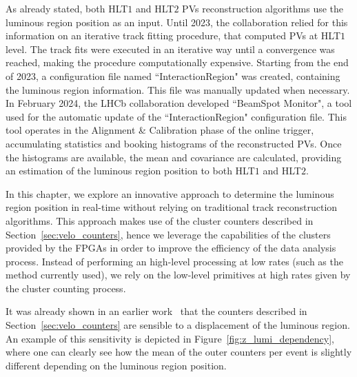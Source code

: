 As already stated, both HLT$1$ and HLT$2$ PVs reconstruction algorithms use the luminous region position as an input. Until 2023, the collaboration relied for this information on an iterative track fitting procedure, that computed PVs at HLT$1$ level. The track fits were executed in an iterative way until a convergence was reached, making the procedure computationally expensive. Starting from the end of 2023, a configuration file named ``InteractionRegion" was created, containing the luminous region information. This file was manually updated when necessary. In February 2024, the LHCb collaboration developed ``BeamSpot Monitor", a tool used for the automatic update of the ``InteractionRegion" configuration file.  This tool operates in the Alignment \& Calibration phase of the online trigger, accumulating statistics and booking histograms of the reconstructed PVs. Once the histograms are available, the mean and covariance are calculated, providing an estimation of the luminous region position to both HLT$1$ and HLT$2$. 

In this chapter, we explore an innovative approach to determine the luminous region position in real-time without relying on traditional track reconstruction algorithms. This approach makes use of the cluster counters described in Section~\ref{sec:velo_counters}, hence we leverage the capabilities of the clusters provided by the FPGAs in order to improve the efficiency of the data analysis process. Instead of performing an high-level processing at low rates (such as the method currently used), we rely on the low-level primitives at high rates given by the cluster counting process.

It was already shown in an earlier work~\cite{dan} that the counters described in Section~\ref{sec:velo_counters} are sensible to a displacement of the luminous region. An example of this sensitivity is depicted in Figure~\ref{fig:z_lumi_dependency}, where one can clearly see how the mean of the outer counters per event is slightly different depending on the luminous region position. 

